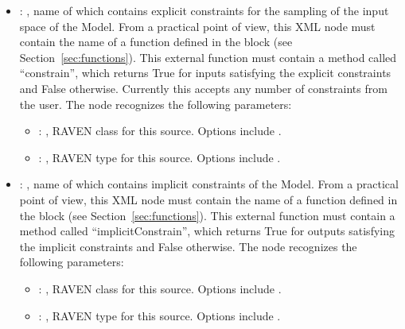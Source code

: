 \begin{itemize}
    \item {}: , 
      name of  which contains explicit constraints for the sampling of
      the input space of the Model. From a practical point of view, this XML node must contain
      the name of a function defined in the  block (see
      Section~\ref{sec:functions}).               This external function must contain a method
      called ``constrain'', which returns True for               inputs satisfying the explicit
      constraints and False otherwise. \nb Currently this accepts any number of constraints from the
      user.
      The  node recognizes the following parameters:
        \begin{itemize}
          \item {}: , 
            RAVEN class for this source. Options include .
          \item {}: , 
            RAVEN type for this source. Options include .
      \end{itemize}

    \item {}: , 
      name of  which contains implicit constraints of the Model. From a practical
      point of view, this XML node must contain the name of a function defined in the
                     block (see Section~\ref{sec:functions}). This external
      function must contain a method called               ``implicitConstrain'', which returns True
      for outputs satisfying the implicit constraints and False otherwise.
      The  node recognizes the following parameters:
        \begin{itemize}
          \item {}: , 
            RAVEN class for this source. Options include .
          \item {}: , 
            RAVEN type for this source. Options include .
      \end{itemize}


\end{itemize}
